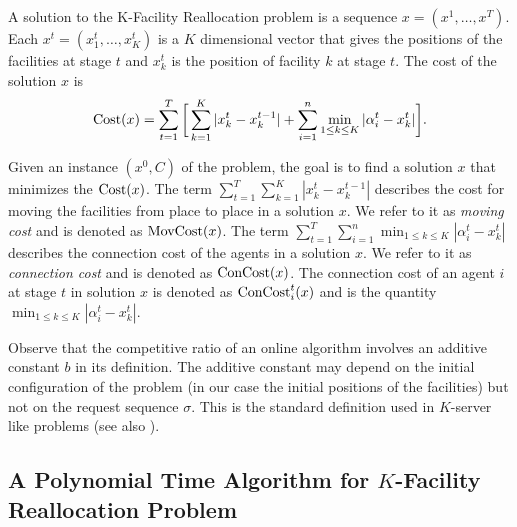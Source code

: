 \begin{definition}\label{d:solution}
A solution to the K-Facility Reallocation problem is a sequence $x = (x^1, \ldots 
,x^T)$.
Each $x^t= (x_1^t,\ldots,x_K^t)$ is a $K$ dimensional vector that gives
the positions of the facilities at stage $t$ and
$x_k^t$ is the position of facility $k$ at stage $t$. The cost of the solution $x$ is
\[ \mathrm{Cost}(x) = \sum_{t=1}^{T} \bigg[\sum 
\limits_{k=1}^K|x_k^t-x_k^{t-1}|+\sum\limits_{i=1}^{n} \min_{1\leq k \leq 
K}|\alpha_i^t-x_k^t| \bigg].\]
\end{definition}
Given an instance $(x^0,C)$ of the problem, the goal is to find a solution $x$
that minimizes the $\mathrm{Cost}(x)$. The term 
$\sum_{t=1}^{T}\sum_{k=1}^K|x_k^t-x_k^{t-1}|$ describes
the cost for moving the facilities from place to place in a solution $x$. We  refer to it as 
\emph{moving cost} and is denoted as $\mathrm{MovCost}(x)$. The 
 term $ \sum_{t=1}^{T}\sum_{i=1}^{n} \min_{1\leq k \leq K}|\alpha_i^t-x_k^t|$ 
describes the connection
cost of the agents in a solution $x$. We refer to it as \emph{connection cost} and is denoted as $\mathrm{ConCost}(x)$. The connection cost of an agent $i$ at stage $t$ in solution $x$ is denoted as $\mathrm{ConCost}_i^t(x)$ and is the quantity  $\min_{1\leq k \leq K}|\alpha_i^t-x_k^t|$. 

Observe that the competitive ratio of an online algorithm involves an additive constant $b$ in its definition. The additive constant may depend on the initial configuration of the problem (in our case the initial positions of the facilities) but not on the request sequence $\sigma$. This is the standard definition used in $K$-server like problems (see also \cite{KP95, BY1998}).



\subsection{A Polynomial Time Algorithm for $K$-Facility Reallocation Problem}
\label{s:offline}



